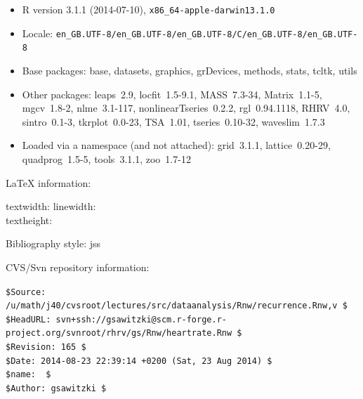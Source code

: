 \documentclass[a4paper, english, utf8]{amsart}
\begin{document}
{\tiny
\begin{itemize}\raggedright
  \item R version 3.1.1 (2014-07-10), \verb|x86_64-apple-darwin13.1.0|
  \item Locale: \verb|en_GB.UTF-8/en_GB.UTF-8/en_GB.UTF-8/C/en_GB.UTF-8/en_GB.UTF-8|
  \item Base packages: base, datasets, graphics, grDevices,
    methods, stats, tcltk, utils
  \item Other packages: leaps~2.9, locfit~1.5-9.1, MASS~7.3-34,
    Matrix~1.1-5, mgcv~1.8-2, nlme~3.1-117,
    nonlinearTseries~0.2.2, rgl~0.94.1118, RHRV~4.0,
    sintro~0.1-3, tkrplot~0.0-23, TSA~1.01, tseries~0.10-32,
    waveslim~1.7.3
  \item Loaded via a namespace (and not attached): grid~3.1.1,
    lattice~0.20-29, quadprog~1.5-5, tools~3.1.1, zoo~1.7-12
\end{itemize}}

\LaTeX{} information:
{\tiny

\currentpage 
textwidth: \prntlen{\textwidth} \qquad 
linewidth:\prntlen{\linewidth}\\
textheight: \prntlen{\textheight}\\
}

Bibliography style: jss

CVS/Svn repository information:

{\tiny%
\noindent
\verb+$Source: /u/math/j40/cvsroot/lectures/src/dataanalysis/Rnw/recurrence.Rnw,v $+\\
\verb!$HeadURL: svn+ssh://gsawitzki@scm.r-forge.r-project.org/svnroot/rhrv/gs/Rnw/heartrate.Rnw $!\\
\verb+$Revision: 165 $+\\
\verb!$Date: 2014-08-23 22:39:14 +0200 (Sat, 23 Aug 2014) $!\\
\verb+$name:  $+\\
\verb+$Author: gsawitzki $+
}
\end{document}
